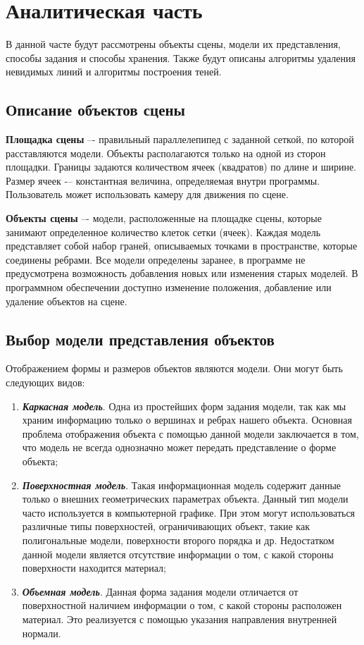 \chapter{Аналитическая часть}

В данной часте будут рассмотрены объекты сцены, модели их представления, способы задания и способы хранения. Также будут описаны алгоритмы 
удаления невидимых линий и алгоритмы построения теней.

\section{Описание объектов сцены}

\textbf{Площадка сцены} –- правильный параллелепипед с заданной сеткой, по которой
расставляются модели. Объекты располагаются только на одной из сторон площадки. Границы
задаются количеством ячеек (квадратов) по длине и ширине. Размер ячеек -– константная величина,
определяемая внутри программы. Пользователь может использовать камеру для движения по сцене.

\textbf{Объекты сцены} –- модели, расположенные на площадке сцены, которые занимают
определенное количество клеток сетки (ячеек). Каждая модель представляет собой набор граней,
описываемых точками в пространстве, которые соединены ребрами. Все модели определены
заранее, в программе не предусмотрена возможность добавления новых или изменения старых
моделей. В программном обеспечении доступно изменение положения, добавление или удаление объектов на сцене.

\section{Выбор модели представления объектов}

Отображением формы и размеров объектов являются модели. Они могут быть следующих видов:
\begin{enumerate}
    \item \textit{\textbf{Каркасная модель}}. Одна из простейших форм задания модели, так как мы храним информацию
    только о вершинах и ребрах нашего объекта. Основная проблема отображения объекта с помощью
    данной модели заключается в том, что модель не всегда однозначно может передать представление
    о форме объекта;
    \item \textit{\textbf{Поверхностная модель}}. Такая информационная модель содержит данные только о внешних
    геометрических параметрах объекта. Данный тип модели часто используется в компьютерной
    графике. При этом могут использоваться различные типы поверхностей, ограничивающих объект,
    такие как полигональные модели, поверхности второго порядка и др. Недостатком данной модели
    является отсутствие информации о том, с какой стороны поверхности находится материал;
    \item \textit{\textbf{Объемная модель}}. Данная форма задания модели отличается от поверхностной наличием
    информации о том, с какой стороны расположен материал. Это реализуется с помощью указания
    направления внутренней нормали.
\end{enumerate}

